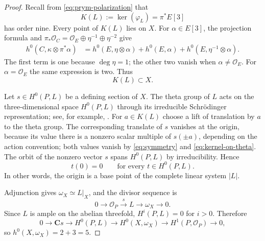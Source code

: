 \documentclass[10pt]{amsart}
\numberwithin{equation}{section}
\theoremstyle{definition}
\theoremstyle{remark}
\newcommand{\CC}{\mathbf C}
\begin{document}
\begin{proof}
Recall from \eqref{eq:prym-polarization} that
\[
 K(L):=\ker(\varphi_L)=\pi^*E[3]
\]
has order nine.  Every point of $K(L)$ lies on $X$.  For
$\alpha\in E[3]$, the projection formula and
$\pi_*\mathcal O_C=\mathcal O_E\oplus\eta^{-1}\oplus\eta^{-2}$ give
\[
\begin{aligned}
 h^0(C,\kappa\otimes\pi^*\alpha)
 &=h^0(E,\eta\otimes\alpha)+h^0(E,\alpha)
   +h^0(E,\eta^{-1}\otimes\alpha).
\end{aligned}
\]
The first term is one because $\deg\eta=1$; the other two vanish when
$\alpha\ne\mathcal O_E$.  For $\alpha=\mathcal O_E$ the same expression is
two.  Thus
\begin{equation}
 K(L)\subset X.
\label{eq:kernel-on-theta}
\end{equation}

Let $s\in H^0(P,L)$ be a defining section of $X$.  The theta group of $L$
acts on the three-dimensional space $H^0(P,L)$ through its irreducible
Schr\"odinger representation; see, for example,
\cite[Chapter~6]{BirkenhakeLange2004}.  For $a\in K(L)$ choose a lift of
translation by $a$ to the theta group.  The corresponding translate of $s$
vanishes at the origin, because its value there is a nonzero scalar multiple
of $s(\pm a)$, depending on the action convention; both values vanish by
\eqref{eq:symmetry} and \eqref{eq:kernel-on-theta}.  The orbit of the
nonzero vector $s$ spans $H^0(P,L)$ by irreducibility.  Hence
\begin{equation}
 t(0)=0\qquad\text{for every }t\in H^0(P,L).
\label{eq:basepoint-origin}
\end{equation}
In other words, the origin is a base point of the complete linear system
$|L|$.

Adjunction gives $\omega_X\simeq L|_X$, and the divisor sequence is
\[
 0\longrightarrow\mathcal O_P\xrightarrow{\,s\,}L
 \longrightarrow\omega_X\longrightarrow0.
\]
Since $L$ is ample on the abelian threefold, $H^i(P,L)=0$ for $i>0$.
Therefore
\begin{equation}
 0\longrightarrow \CC s\longrightarrow H^0(P,L)
 \longrightarrow H^0(X,\omega_X)
 \longrightarrow H^1(P,\mathcal O_P)\longrightarrow0,
\label{eq:canonical-sections-exact}
\end{equation}
so $h^0(X,\omega_X)=2+3=5$.


\end{proof}
\end{document}
